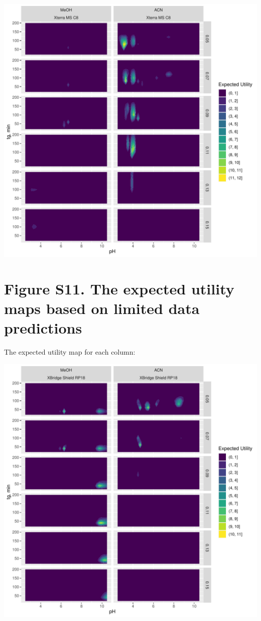 \documentclass[
]{article}
\begin{document}
\newpage{}

\includegraphics{../figures/casestudy1/utilitymap/utilitymap5.pdf}

\newpage{}

\hypertarget{figure-s11.-the-expected-utility-maps-based-on-limited-data-predictions}{%
\section{Figure S11. The expected utility maps based on limited data
predictions}\label{figure-s11.-the-expected-utility-maps-based-on-limited-data-predictions}}

The expected utility map for each column:

\includegraphics{../figures/casestudy2/utilitymap/utilitymap1.pdf}
\end{document}
